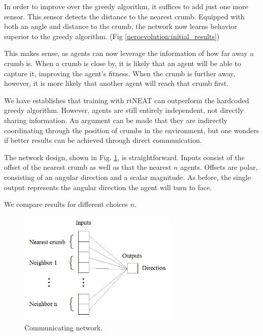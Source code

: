 \documentclass[conference]{IEEEtran}
\begin{document}
In order to improve over the greedy algorithm, it suffices to add just one more sensor. This sensor detects the distance to the nearest crumb. Equipped with both an angle and distance to the crumb, the network now learns behavior superior to the greedy algorithm. (Fig \ref{neroevolution:initial_results})

This makes sense, as agents can now leverage the information of how far away a crumb is. When a crumb is close by, it is likely that an agent will be able to capture it, improving the agent's fitness. When the crumb is further away, however, it is more likely that another agent will reach that crumb first. 


We have establishes that training with rtNEAT can outperform the hardcoded greedy algorithm. However, agents are still entirely independent, not directly sharing information. An argument can be made that they are indirectly coordinating through the position of crumbs in the environment, but one wonders if better results can be achieved through direct communication.

The network design, shown in Fig. \ref{neroevolution:communication}, is straightforward. Inputs consist of the offset of the nearest crumb as well as that the nearest $n$ agents. Offsets are polar, consisting of an angular direction and a scalar magnitude. As before, the single output represents the angular direction the agent will turn to face. 

We compare results for different choices $n$. 

\begin{figure}[t]
\centering
\includegraphics[width=3.0in]{./figures/neroevolution/comm_network.png}
\caption{Communicating network.}
\label{neroevolution:communication}
\end{figure}
\end{document}
